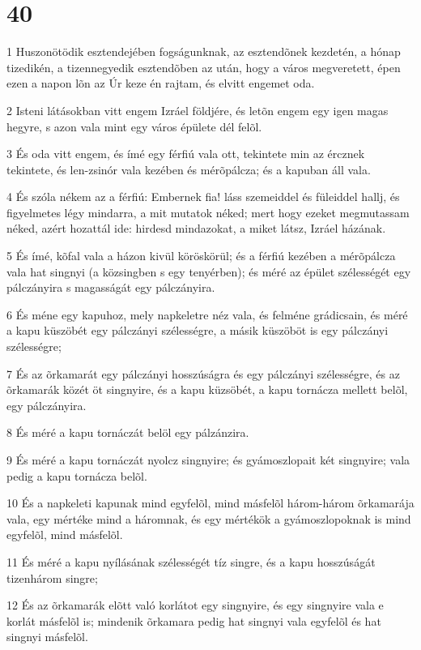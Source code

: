 \chapter{40}

\par 1 Huszonötödik esztendejében fogságunknak, az esztendõnek kezdetén, a hónap tizedikén, a tizennegyedik esztendõben az után, hogy a város megveretett, épen ezen a napon lõn az Úr keze én rajtam, és elvitt engemet oda.
\par 2 Isteni látásokban vitt engem Izráel földjére, és letõn engem egy igen magas hegyre, s azon vala mint egy város épülete dél felõl.
\par 3 És oda vitt engem, és ímé egy férfiú vala ott, tekintete min az ércznek tekintete, és len-zsinór vala kezében és mérõpálcza; és a kapuban áll vala.
\par 4 És szóla nékem az a férfiú: Embernek fia! láss szemeiddel és füleiddel hallj, és figyelmetes légy mindarra, a mit mutatok néked; mert hogy ezeket megmutassam néked, azért hozattál ide: hirdesd mindazokat, a miket látsz, Izráel házának.
\par 5 És ímé, kõfal vala a házon kivül köröskörül; és a férfiú kezében a mérõpálcza vala hat singnyi (a közsingben s egy tenyérben); és méré az épület szélességét egy pálczányira s magasságát egy pálczányira.
\par 6 És méne egy kapuhoz, mely napkeletre néz vala, és felméne grádicsain, és méré a kapu küszöbét egy pálczányi szélességre, a másik küszöböt is egy pálczányi szélességre;
\par 7 És az õrkamarát egy pálczányi hosszúságra és egy pálczányi szélességre, és az õrkamarák közét öt singnyire, és a kapu küzsöbét, a kapu tornácza mellett belõl, egy pálczányira.
\par 8 És méré a kapu tornáczát belöl egy pálzánzira.
\par 9 És méré a kapu tornáczát nyolcz singnyire; és gyámoszlopait két singnyire; vala pedig a kapu tornácza belõl.
\par 10 És a napkeleti kapunak mind egyfelõl, mind másfelõl három-három õrkamarája vala, egy mértéke mind a háromnak, és egy mértékök a gyámoszlopoknak is mind egyfelõl, mind másfelõl.
\par 11 És méré a kapu nyílásának szélességét tíz singre, és a kapu hosszúságát tizenhárom singre;
\par 12 És az õrkamarák elõtt való korlátot egy singnyire, és egy singnyire vala e korlát másfelõl is; mindenik õrkamara pedig hat singnyi vala egyfelõl és hat singnyi másfelõl.
